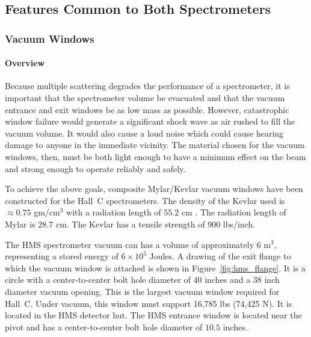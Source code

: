 \subsection{Features Common to Both Spectrometers}

\subsubsection{Vacuum Windows}

\paragraph{Overview}

Because multiple scattering degrades the performance of a spectrometer, it is
important that the spectrometer volume be evacuated and that the vacuum
entrance and exit windows
be as low mass as possible. However,
catastrophic window failure would generate a significant shock wave as air
rushed to fill the vacuum volume. It would also cause a loud noise which
could cause hearing damage to anyone in the immediate vicinity.
The material chosen for the vacuum windows, then, must be both light enough
to have a minimum effect on the beam and
strong enough to operate reliably and safely.

To achieve the above goals,
composite Mylar/Kevlar vacuum windows have been constructed for the
Hall~C spectrometers. The density of the Kevlar used
is $\approx 0.75$ gm/cm$^3$ with a radiation
length of $55.2$ cm \cite{rdup1}. The radiation length
of Mylar is $28.7$ cm. The Kevlar has a tensile strength of 900 lbs/inch.

The HMS spectrometer vacuum can has a volume
of approximately $6$ m$^3$, representing a stored energy of $6 \times 10^5$
Joules. A drawing of the exit flange to which the vacuum
window is attached is shown in Figure~\ref{fig:hms_flange}.  It is a
circle with a center-to-center bolt hole diameter of $40$ inches
and a $38$ inch diameter vacuum opening. This is the largest vacuum window
required for Hall~C.
Under vacuum, this window must support 16,785
lbs (74,425 N). It is located in the HMS detector hut. The HMS
entrance window is located near the pivot and has a center-to-center
bolt hole diameter of $10.5$ inches.

